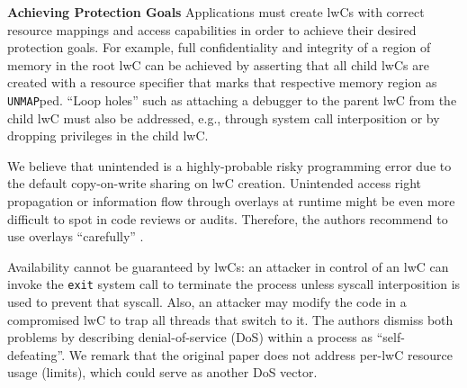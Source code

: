 \documentclass[10pt,twocolumn,a4paper]{article}
\begin{document}
\textbf{Achieving Protection Goals}\hspace{1em}
Applications must create lwCs with correct resource mappings and access capabilities in order to achieve their desired protection goals.
For example, full confidentiality and integrity of a region of memory in the root lwC can be achieved by asserting that all child lwCs are created with a resource specifier that marks that respective memory region as \lstinline{UNMAP}ped.
\enquote{Loop holes} such as attaching a debugger to the parent lwC from the child lwC must also be addressed, e.g., through system call interposition or by dropping privileges in the child lwC.

We believe that unintended is a highly-probable risky programming error due to the default copy-on-write sharing on lwC creation.
Unintended access right propagation or information flow through overlays at runtime might be even more difficult to spot in code reviews or audits.
Therefore, the authors recommend to use overlays \enquote{carefully} \cite{lwcpaper}.

Availability cannot be guaranteed by lwCs:
an attacker in control of an lwC can invoke the \lstinline{exit} system call to terminate the process unless syscall interposition is used to prevent that syscall.
Also, an attacker may modify the code in a compromised lwC to trap all threads that switch to it.
The authors dismiss both problems by describing denial-of-service (DoS) within a process as \enquote{self-defeating}.
\cite{lwcpaper}
We remark that the original paper does not address per-lwC resource usage (limits), which could serve as another DoS vector. 




\end{document}
